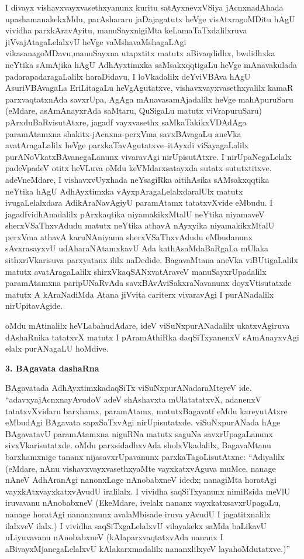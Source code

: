 I divayx vishavxvayxvasethxyanunx kuritu satAyxnevxVSiya jAcnxnadAhada upashamanakekxMdu, parAshararu jaDajagatutx heVge visAtxragoMDitu hAgU vividha parxkAravAyitu, manuSayx\-nigiMta keLamaTaTxdalilxruva jiVvajAtagaLelalxvU heVge vaMshavaMshagaLAgi vikasana\-goMDavu,\break manuSayxna utapxtitx matutx aBivaqdidhx, bwdidhxka neYtika sAmAjika hAgU AdhAyxtimxka saMsakxqqti\-gaLu heVge mAnavakulada padarapadaragaLalilx haraDidavu, I loVkadalilx deYviVBAva hAgU AsuriVBAvagaLa EriLitagaLu heVgAgutatxve, vishavxvayxvasethxyalilx kamaR parxvaqtatx\-nAda savxrUpa, AgAga mAnavasamAjadalilx heVge mahApuruSaru (eMdare, asAmAnayxrAda saMtaru, QuSigaLu matutx viVrapuruSaru) pArxduBaRvisutAtxre, jagadf vayxvasethx saMkaTakikxVDAdAga paramAtamxna shakitx-jAcnxna-perxVma savxBAvagaLu aneVka avatAragaLalilx heVge parxkaTavAgutatxve--itAyxdi viSayagaLalilx purANoVkatxBAvanegaLanunx vivaravAgi nirUpisutAtxre. I nirUpaNegaLelalx padeVpadeV otitx heVLuva oMdu keVMdarxsatayxda sutatx sututxtitxve. adeVneMdare, I vishavxvUyxhada neYsagiRka aitihAsika sAMsakxqqtika neYtika hAgU AdhAyxtimxka vAyxpAragaLelalxdaralUlx matutx ivugaLelalxdara AdikAraNavAgiyU paramAtamx tatatxvXvide eMbudu. I jagadfvidhAnadalilx pArxkaqtika niyamakikxMtalU neYtika niyamaveV sherxVSaThxvAdudu matutx neYtika athavA nAyxyika niyamakikxMtalU perxVma athavA karuNAniyama sherxVSaThxvAdudu eMbudanunx sAvxrasayxvU udAharaNAtamxkavU Ada kathAsaMdaBaRgaLa mUlaka sithxriVkarisuva parxyatanx ililx naDedide. BagavaMtana aneVka viBUtigaLalilx matutx avatAragaLalilx shirxVkaqSANxvatAraveV manuSayxrUpadalilx paramAtamxna paripUNaRvAda savxBAvAviSakxraNavanunx doyxVtisutatxde matutx A kAraNadiMda Atana jiVvita cariterx vivaravAgi I purANadalilx nirUpitavAgide.

oMdu mAtinalilx heVLabahudAdare, ideV viSuNxpurANadalilx ukatxvAgiruva dAshaRnika tatatxvX matutx I pAramAthiRka daqSiTxyanenxV sAmAnayxvAgi elalx purANagaLU hoMdive.

\smallskip
\begin{center}
{\Large\bf 3. BAgavata dashaRna}
\end{center}

BAgavatada AdhAyxtimxkadaqSiTx viSuNxpurANadaraMteyeV ide. ``adavxyajAcnxna\break \hbox{yAvudoV} adeV shAshavxta mUlatatatxvX, adanenxV tatatxvXvidaru barxhamx, paramAtamx, matutx\break Bagavatf eMdu kareyutAtxre eMbudAgi BAgavata sapxSaTxvAgi nirUpisutatxde. viSuNx\-purANada hAge BAgavatavU paramAtamxna niguRNa matutx saguNa savxrUpagaLanunx sivxVkari\-sutatxde. oMdu parxsidadhxvAda sholxVkadalilx, BagavaMtanu barxhamxnige tananx nijasavxrUpavanunx parxkaTa\-goLisutAtxne: ``Adiyalilx (eMdare, nAnu vishavxvayxvasethxyaMte vayxkatxvAguva muMce, nanage nAneV AdhAranAgi nanonxLage nAnobabxneV idedx; nanagiMta horatAgi vayxkAtxvayxkatx\-vAvudU iralilalx. I vividha saqSiTxyanunx nimiRsida meVlU iruvavanu nAnobabxneV (EkeMdare, ivelalx nananx vayxkatxsavxrUpagaLu, nanage horatAgi nananxnunx avalaMbisade iruva yAvudU I jagatitxnalilx ilalxveV ilalx.) I vividha saqSiTxgaLelalxvU vilayakekx saMda baLikavU uLiyuvavanu nAnobabxneV (kAlaparxvaqtatxvAda nananx I aBivayxMjanegaLelalxvU kAlakarxmadalilx nananxlilxyeV layahoMdutatxve.)''

